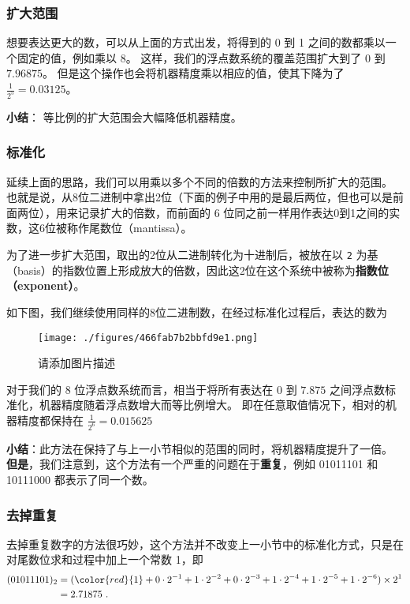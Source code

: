 \subsubsection{扩大范围}

想要表达更大的数，可以从上面的方式出发，将得到的 0 到 1 之间的数都乘以一个固定的值，例如乘以 8。 这样，我们的浮点数系统的覆盖范围扩大到了 $0$ 到 $7.96875$。 但是这个操作也会将机器精度乘以相应的值，使其下降为了  $\frac{1}{2^5}=0.03125$。

\textbf{小结}： 等比例的扩大范围会大幅降低机器精度。

\subsubsection{标准化}

延续上面的思路，我们可以用乘以多个不同的倍数的方法来控制所扩大的范围。 也就是说，从8位二进制中拿出2位（下面的例子中用的是最后两位，但也可以是前面两位），用来记录扩大的倍数，而前面的 6 位同之前一样用作表达0到1之间的实数，这6位被称作尾数位（mantissa）。 

为了进一步扩大范围，取出的2位从二进制转化为十进制后，被放在以 \verb|2| 为基（basis）的指数位置上形成放大的倍数，因此这2位在这个系统中被称为\textbf{指数位（exponent）}。

如下图，我们继续使用同样的8位二进制数，在经过标准化过程后，表达的数为

\begin{figure}[ht]
\centering
\texttt{[image: ./figures/466fab7b2bbfd9e1.png]}
\caption{请添加图片描述} \label{fig_CmArit_1}
\end{figure}

对于我们的 8 位浮点数系统而言，相当于将所有表达在 $0$ 到 $7.875$ 之间浮点数标准化，机器精度随着浮点数增大而等比例增大。 即在任意取值情况下，相对的机器精度都保持在 $\frac{1}{2^6}=0.015625$

\textbf{小结}：此方法在保持了与上一小节相似的范围的同时，将机器精度提升了一倍。 \textbf{但是}，我们注意到，这个方法有一个严重的问题在于\textbf{重复}，例如 01011101 和 10111000 都表示了同一个数。

\subsubsection{去掉重复}

去掉重复数字的方法很巧妙，这个方法并不改变上一小节中的标准化方式，只是在对尾数位求和过程中加上一个常数 1，即
\begin{equation}
\begin{aligned}
(01011101)_2 &=({\color{red}{1}}+0\cdot2^{-1}+1\cdot2^{-2}+0\cdot2^{-3}+1\cdot2^{-4}+1\cdot2^{-5}+1\cdot2^{-6})\times2^1\\
&= 2.71875~.
\end{aligned}
\end{equation}

